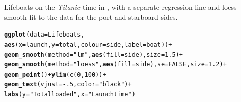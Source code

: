 \documentclass[11pt]{book}\usepackage[]{graphicx}\usepackage[]{color}
\makeatletter
\newcommand{\hlnum}[1]{\textcolor[rgb]{0.686,0.059,0.569}{#1}}%
\newcommand{\hlstr}[1]{\textcolor[rgb]{0.192,0.494,0.8}{#1}}%
\newcommand{\hlopt}[1]{\textcolor[rgb]{0,0,0}{#1}}%
\newcommand{\hlstd}[1]{\textcolor[rgb]{0.345,0.345,0.345}{#1}}%
\newcommand{\hlkwc}[1]{\textcolor[rgb]{0.333,0.667,0.333}{#1}}%
\newcommand{\hlkwd}[1]{\textcolor[rgb]{0.737,0.353,0.396}{\textbf{#1}}}%
\newenvironment{kframe}{%
 \def\at@end@of@kframe{}%
 \ifinner\ifhmode%
  \def\at@end@of@kframe{\end{minipage}}%
  \begin{minipage}{\columnwidth}%
 \fi\fi%
 \def\FrameCommand##1{\hskip\@totalleftmargin \hskip-\fboxsep
 \colorbox{shadecolor}{##1}\hskip-\fboxsep
     \hskip-\linewidth \hskip-\@totalleftmargin \hskip\columnwidth}%
 \MakeFramed {\advance\hsize-\width
   \@totalleftmargin\z@ \linewidth\hsize
   \@setminipage}}%
 {\par\unskip\endMakeFramed%
 \at@end@of@kframe}
\newenvironment{knitrout}{}{} %
\renewenvironment{knitrout}{\small\renewcommand{\baselinestretch}{.85}}{} %
\makeatother
\begin{document}
\begin{Example}[lifeboat1]{Lifeboats on the \emph{Titanic}}
                                                                                                                                                                                                                                                                                                                                                                                                                                                                                                                                                                                                                                                                                                                                                                                                                                                                                                                                                                                                                                                                                                                                                                                                                  time in ,
with a separate regression line and loess smooth
fit to the data for the port and starboard
sides.

\begin{knitrout}
\color{fgcolor}\begin{kframe}
\begin{alltt}
\hlkwd{ggplot}\hlstd{(}\hlkwc{data} \hlstd{= Lifeboats,}
       \hlkwd{aes}\hlstd{(}\hlkwc{x}\hlstd{=launch,} \hlkwc{y}\hlstd{=total,} \hlkwc{colour}\hlstd{=side,}  \hlkwc{label}\hlstd{=boat))} \hlopt{+}
     \hlkwd{geom_smooth}\hlstd{(}\hlkwc{method}\hlstd{=}\hlstr{"lm"}\hlstd{,} \hlkwd{aes}\hlstd{(}\hlkwc{fill}\hlstd{=side),} \hlkwc{size}\hlstd{=}\hlnum{1.5}\hlstd{)} \hlopt{+}
     \hlkwd{geom_smooth}\hlstd{(}\hlkwc{method}\hlstd{=}\hlstr{"loess"}\hlstd{,} \hlkwd{aes}\hlstd{(}\hlkwc{fill}\hlstd{=side),} \hlkwc{se}\hlstd{=}\hlnum{FALSE}\hlstd{,} \hlkwc{size}\hlstd{=}\hlnum{1.2}\hlstd{)} \hlopt{+}
     \hlkwd{geom_point}\hlstd{()} \hlopt{+} \hlkwd{ylim}\hlstd{(}\hlkwd{c}\hlstd{(}\hlnum{0}\hlstd{,}\hlnum{100}\hlstd{))} \hlopt{+}
     \hlkwd{geom_text}\hlstd{(}\hlkwc{vjust}\hlstd{=}\hlopt{-}\hlnum{.5}\hlstd{,} \hlkwc{color}\hlstd{=}\hlstr{"black"}\hlstd{)} \hlopt{+}
     \hlkwd{labs}\hlstd{(}\hlkwc{y}\hlstd{=}\hlstr{"Total loaded"}\hlstd{,} \hlkwc{x}\hlstd{=}\hlstr{"Launch time"}\hlstd{)}
\end{alltt}
\end{kframe}\begin{figure}[htbp]



\end{figure}
\end{knitrout}
\end{Example}
\end{document}

